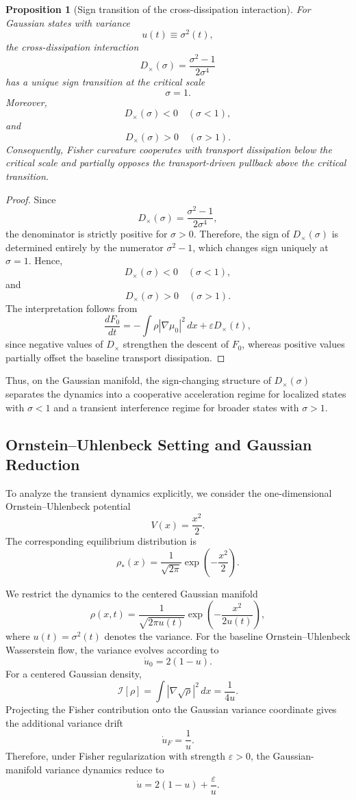 \documentclass[aps,prl,twocolumn,10pt,superscriptaddress]{revtex4-2}
\newtheorem{proposition}{Proposition}
\begin{document}
\begin{proposition}[Sign transition of the cross-dissipation interaction]
For Gaussian states with variance
\[
u(t)\equiv\sigma^2(t),
\]
the cross-dissipation interaction
\[
D_\times(\sigma)
=
\frac{\sigma^2-1}{2\sigma^4}
\]
has a unique sign transition at the critical scale
\[
\sigma=1.
\]
Moreover,
\[
D_\times(\sigma)<0
\quad
(\sigma<1),
\]
and
\[
D_\times(\sigma)>0
\quad
(\sigma>1).
\]
Consequently, Fisher curvature cooperates with transport dissipation below
the critical scale and partially opposes the transport-driven pullback above
the critical transition.
\end{proposition}

\begin{proof}
Since
\[
D_\times(\sigma)
=
\frac{\sigma^2-1}{2\sigma^4},
\]
the denominator is strictly positive for $\sigma>0$. Therefore, the sign of
$D_\times(\sigma)$ is determined entirely by the numerator $\sigma^2-1$,
which changes sign uniquely at $\sigma=1$. Hence,
\[
D_\times(\sigma)<0
\quad
(\sigma<1),
\]
and
\[
D_\times(\sigma)>0
\quad
(\sigma>1).
\]
The interpretation follows from
\[
\frac{dF_0}{dt}
=
-
\int
\rho |\nabla\mu_0|^2\,dx
+
\varepsilon D_\times(t),
\]
since negative values of $D_\times$ strengthen the descent of $F_0$, whereas
positive values partially offset the baseline transport dissipation.
\end{proof}

Thus, on the Gaussian manifold, the sign-changing structure of
$D_\times(\sigma)$ separates the dynamics into a cooperative acceleration
regime for localized states with $\sigma<1$ and a transient interference
regime for broader states with $\sigma>1$.

\subsection{Ornstein--Uhlenbeck Setting and Gaussian Reduction}

To analyze the transient dynamics explicitly, we consider the one-dimensional Ornstein--Uhlenbeck potential
\[
V(x)=\frac{x^2}{2}.
\]
The corresponding equilibrium distribution is
\[
\rho_\ast(x)
=
\frac{1}{\sqrt{2\pi}}
\exp\left(
-\frac{x^2}{2}
\right).
\]

We restrict the dynamics to the centered Gaussian manifold
\[
\rho(x,t)
=
\frac{1}{\sqrt{2\pi u(t)}}
\exp\left(
-\frac{x^2}{2u(t)}
\right),
\]
where $u(t)=\sigma^2(t)$ denotes the variance. For the baseline Ornstein--Uhlenbeck Wasserstein flow, the variance evolves according to
\[
\dot{u}_0=2(1-u).
\]
For a centered Gaussian density,
\[
\mathcal{I}[\rho]
=
\int |\nabla\sqrt{\rho}|^2\,dx
=
\frac{1}{4u}.
\]
Projecting the Fisher contribution onto the Gaussian variance coordinate gives the additional variance drift
\[
\dot{u}_F=\frac{1}{u}.
\]
Therefore, under Fisher regularization with strength $\varepsilon>0$, the Gaussian-manifold variance dynamics reduce to
\[
\dot{u}
=
2(1-u)
+
\frac{\varepsilon}{u}.
\]
\end{document}

